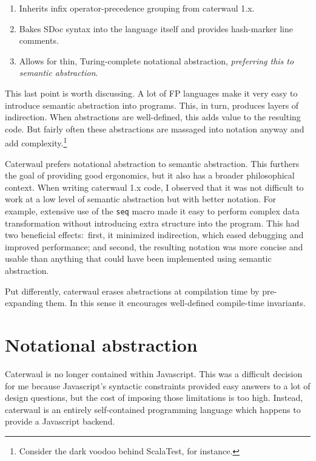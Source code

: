 \documentclass{report}
\begin{document}
\begin{enumerate}
\item{Inherits infix operator-precedence grouping from caterwaul 1.x.}
\item{Bakes SDoc syntax into the language itself and provides hash-marker line comments.}
\item{Allows for thin, Turing-complete notational abstraction, {\em preferring this to semantic abstraction}.}
\end{enumerate}

    This last point is worth discussing. A lot of FP languages make it very easy to introduce semantic abstraction into programs. This, in turn, produces layers of indirection. When
    abstractions are well-defined, this adds value to the resulting code. But fairly often these abstractions are massaged into notation anyway and add complexity.\footnote{Consider the dark
    voodoo behind ScalaTest, for instance.}

    Caterwaul prefers notational abstraction to semantic abstraction. This furthers the goal of providing good ergonomics, but it also has a broader philosophical context. When writing
    caterwaul 1.x code, I observed that it was not difficult to work at a low level of semantic abstraction but with better notation. For example, extensive use of the {\tt seq} macro made it
    easy to perform complex data transformation without introducing extra structure into the program. This had two beneficial effects:~first, it minimized indirection, which eased debugging
    and improved performance; and second, the resulting notation was more concise and usable than anything that could have been implemented using semantic abstraction.

    Put differently, caterwaul erases abstractions at compilation time by pre-expanding them. In this sense it encourages well-defined compile-time invariants.

\chapter{Notational abstraction}
  Caterwaul is no longer contained within Javascript. This was a difficult decision for me because Javascript's syntactic constraints provided easy answers to a lot of design questions, but
  the cost of imposing those limitations is too high. Instead, caterwaul is an entirely self-contained programming language which happens to provide a Javascript backend.
\end{document}
